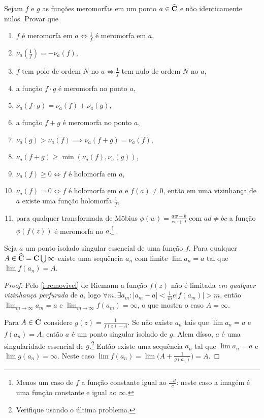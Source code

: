 \begin{problema}
Sejam $f$ e $g$ as funções meromorfas em um ponto $a\in\widehat{\mathbf{C}}$
e não identicamente nulos.
Provar que
\begin{enumerate}
\item $f$ é meromorfa em $a \iff \frac{1}{f}$ é meromorfa em $a$,
\item $\nu_a(\frac{1}{f}) = -\nu_a(f)$,
\item $f$ tem polo de ordem $N$ no $a \iff \frac{1}{f}$ tem nulo de ordem $N$ no $a$,
\item a função $f\cdot g$ é meromorfa no ponto $a$,
\item $\nu_a(f\cdot g) = \nu_a(f) + \nu_a(g)$,
\item a função $f+g$ é meromorfa no ponto $a$,
\item $\nu_a(g)>\nu_a(f) \implies \nu_a(f + g) = \nu_a(f)$,
\item $\nu_a(f + g) \geq \min(\nu_a(f), \nu_a(g))$,
\item $\nu_a(f)\geq 0 \iff f$ é holomorfa em $a$,
\item $\nu_a(f) = 0 \iff f$ é holomorfa em $a$ e $f(a)\neq 0$,
então em uma vizinhança de $a$ existe uma função holomorfa $\frac{1}{f}$,
\item para qualquer transformada de Möbius $\phi(w) = \frac{aw+b}{cw+d}$ com
$ad\neq bc$ a função $\phi(f(z))$ é meromorfa no $a$.\footnote{Menos um caso de $f$
a função constante igual ao $\frac{-d}{c}$: neste caso a imagém é uma função constante
e igual ao $\infty$.}
\end{enumerate}
\end{problema}

\begin{teorema}
Seja $a$ um ponto isolado singular essencial de uma função $f$.
Para qualquer $A\in\widehat{\mathbf{C}} = \mathbf{C}\bigcup\infty$ existe uma sequência
$a_n$ com limite $\lim a_n = a$ tal que $\lim f(a_n) = A$.
\end{teorema}
\begin{proof}
Pelo \eqref{i-removivel} de Riemann
a função $f(z)$ não é limitada \emph{em qualquer vizinhança perfurada} de $a$,
logo $\forall m,\exists a_m: |a_m-a|<\frac{1}{m} \textit{e} |f(a_m)|>m$,
então $\lim_{m\to\infty} a_m = a$ e $\lim_{m\to\infty} f(a_m) = \infty$,
o que mostra o caso $A=\infty$.

Para $A\in\mathbf{C}$ considere $g(z) = \frac{1}{f(z)-A}$.
Se não existe $a_n$ tais que $\lim a_n = a$ e $f(a_n) = A$,
então $a$ é um ponto singular isolado de $g$. Alem dísso,
$a$ é uma singularidade essencial de $g$.\footnote{Verifique usando o última problema.}
Então existe uma sequência $a_n$ tal que $\lim a_n = a$ e $\lim g(a_n) = \infty$.
Neste caso $\lim f(a_n) = \lim \big(A + \frac{1}{g(a_n)}\big) = A$.
\end{proof}

